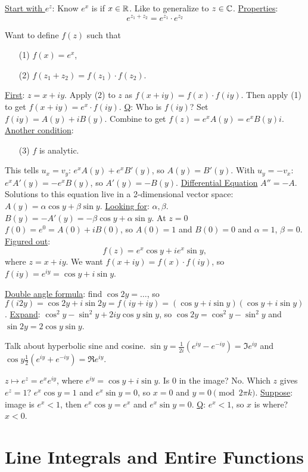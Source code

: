 \documentclass[]{article}
\begin{document}
\underline{Start with $e^z$}: Know $e^x$ is if $x\in\mathbb{R}$. Like to generalize to $z\in\mathbb{C}$.
\underline{Properties}: $$e^{z_1+z_2} = e^{z_1}\cdot e^{z_2}$$
\begin{definition}
	Want to define $f(z)$ such that \begin{itemize}
		\item[(1)] $f(x) = e^x$,
		\item[(2)] $f(z_1+z_2) = f(z_1)\cdot f(z_2)$.
	\end{itemize}
\end{definition}
\underline{First}: $z=x+iy$. Apply (2) to $z$ as $f(x+iy)=f(x)\cdot f(iy)$. Then apply (1) to get $f(x+iy) = e^x\cdot f(iy)$.
\underline{Q}: Who is $f(iy)$? Set $f(iy)=A(y) + iB(y)$.
Combine to get $f(z) = e^x A(y) = e^x B(y)i$.
\underline{Another condition}: 
\begin{itemize}
	\item[(3)] $f$ is analytic.
\end{itemize}
This tells $u_x=v_y$: $e^x A(y) + e^xB'(y)$, so $A(y) = B'(y)$. With $u_y=-v_x$: $e^x A'(y) = -e^xB(y)$, so $A'(y) = -B(y)$. \underline{Differential Equation} $A''=-A$. Solutions to this equation live in a 2-dimensional vector space: $A(y) = \alpha \cos{y} + \beta \sin{y}$. \underline{Looking for}: $\alpha,\beta$. $B(y) = -A'(y) = -\beta\cos{y} + \alpha \sin{y}$. At \underline{$z=0$} $f(0) = e^0 = A(0) + iB(0)$, so $A(0) = 1$ and $B(0)=0$ and $\alpha=1$, $\beta=0$.
\underline{Figured out}: $$f(z) = e^x\cos{y} + ie^x\sin{y},$$
where $z=x+iy$. We want $f(x+iy)=f(x)\cdot f(iy)$, so $f(iy) = e^{iy} = \cos{y} + i\sin{y}$.

\underline{Double angle formula}: find $\cos{2y} = \dots$, so $f(i2y) = \cos{2y} + i\sin{2y} = f(iy + iy) = (\cos{y} + i\sin{y})(\cos{y}+i\sin{y})$. \underline{Expand}: $\cos^2{y} -\sin^2{y} + 2iy\cos{y}\sin{y}$, so $\cos{2y} = \cos^2{y}-\sin^2{y}$ and $\sin{2y} = 2\cos{y}\sin{y}$.

Talk about hyperbolic sine and cosine. $\sin{y} = \frac{1}{2i}(e^{iy}-e^{-iy}) = \Im e^{iy}$ and $\cos{y}\frac{1}{2}(e^{iy}+e^{-iy}) = \Re e^{iy}$.

$z\mapsto e^z = e^x e^{iy}$, where $e^{iy} = \cos{y} + i\sin{y}$. Is 0 in the image? No. Which $z$ gives $e^z=1$? $e^x\cos{y} = 1$ and $e^x\sin{y}=0$, so $x=0$ and $y=0\pmod{2\pi k}$. \underline{Suppose}: image is $e^x<1$, then $e^x\cos{y} = e^x$ and $e^x \sin{y} = 0$. \underline{Q}: $e^x<1$, so $x$ is where? $x<0$.

\section{Line Integrals and Entire Functions}
\end{document}
